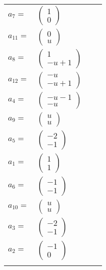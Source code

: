 \documentclass[1p]{elsarticle_modified}
\theoremstyle{definition}
\begin{document}
\begin{tabular}{m{7pt} m{180pt} m{7pt} m{180pt} }
\flushright $a_{7}=$&$\begin{pmatrix}1\\0\end{pmatrix}$ \\
\flushright $a_{11}=$&$\begin{pmatrix}0\\u\end{pmatrix}$ \\
\flushright $a_{8}=$&$\begin{pmatrix}1\\- u+1\end{pmatrix}$ \\
\flushright $a_{12}=$&$\begin{pmatrix}- u\\- u+1\end{pmatrix}$ \\
\flushright $a_{4}=$&$\begin{pmatrix}- u-1\\- u\end{pmatrix}$ \\
\flushright $a_{9}=$&$\begin{pmatrix}u\\u\end{pmatrix}$ \\
\flushright $a_{5}=$&$\begin{pmatrix}-2\\-1\end{pmatrix}$ \\
\flushright $a_{1}=$&$\begin{pmatrix}1\\1\end{pmatrix}$ \\
\flushright $a_{6}=$&$\begin{pmatrix}-1\\-1\end{pmatrix}$ \\
\flushright $a_{10}=$&$\begin{pmatrix}u\\u\end{pmatrix}$ \\
\flushright $a_{3}=$&$\begin{pmatrix}-2\\-1\end{pmatrix}$ \\
\flushright $a_{2}=$&$\begin{pmatrix}-1\\0\end{pmatrix}$\\&\end{tabular}
\end{document}
